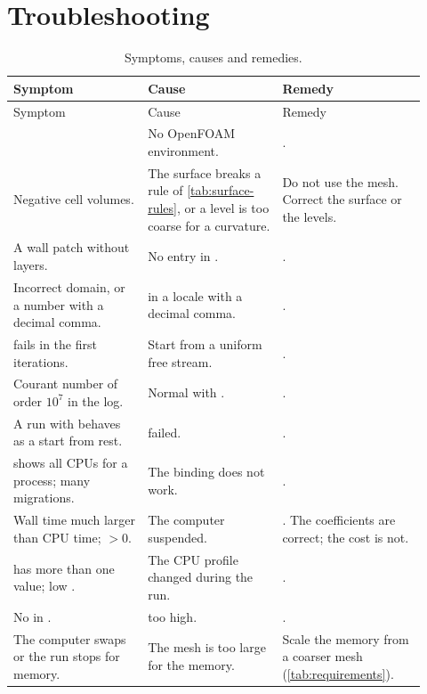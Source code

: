 \chapter{Troubleshooting}\label{ch:troubleshooting}

\begin{longtable}{@{}P{0.30\linewidth} P{0.30\linewidth} P{0.32\linewidth}@{}}
\caption{Symptoms, causes and remedies.}\label{tab:troubleshooting}\\
\toprule
Symptom & Cause & Remedy \\
\midrule
\endfirsthead
\toprule
Symptom & Cause & Remedy \\
\midrule
\endhead
{} & No OpenFOAM environment. & . \\
Negative cell volumes. & The surface breaks a rule of \cref{tab:surface-rules}, or a level is too coarse for a curvature. & Do not use the mesh. Correct the surface or the levels. \\
A wall patch without layers. & No entry in . & . \\
Incorrect domain, or a number with a decimal comma. &  in a locale with a decimal comma. & . \\
 fails in the first iterations. & Start from a uniform free stream. & . \\
Courant number of order $10^7$ in the log. & Normal with . & . \\
A run with  behaves as a start from rest. &  failed. & . \\
 shows all CPUs for a process; many migrations. & The binding does not work. & . \\
Wall time much larger than CPU time;  $> 0$. & The computer suspended. & . The coefficients are correct; the cost is not. \\
 has more than one value; low . & The CPU profile changed during the run. & . \\
No  in . &  too high. & . \\
The computer swaps or the run stops for memory. & The mesh is too large for the memory. & Scale the memory from a coarser mesh (\cref{tab:requirements}). \\

\end{longtable}
